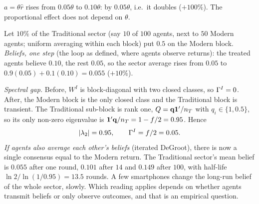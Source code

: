 \documentclass[../solutions_manual.tex]{subfiles}
\begin{document}
 $a = \theta\hat r$ rises from $0.05\theta$ to $0.10\theta$: by $0.05\theta$, i.e.\ it doubles ($+100\%$). The proportional effect does not depend on $\theta$.

 Let $10\%$ of the Traditional sector (say $10$ of $100$ agents, next to $50$ Modern agents; uniform averaging within each block) put $0.5$ on the Modern block. \emph{Beliefs, one step} (the loop as defined, where agents observe returns): the treated agents believe $0.10$, the rest $0.05$, so the sector average rises from $0.05$ to $0.9(0.05) + 0.1(0.10) = 0.055$ ($+10\%$).

\emph{Spectral gap.} Before, $W^I$ is block-diagonal with two closed classes, so $\Gamma^I = 0$. After, the Modern block is the only closed class and the Traditional block is transient. The Traditional sub-block is rank one, $Q = \mathbf{q}\mathbf{1}'/n_T$ with $q_i \in \{1, 0.5\}$, so its only non-zero eigenvalue is $\mathbf{1}'\mathbf{q}/n_T = 1 - f/2 = 0.95$. Hence
\[
|\lambda_2| = 0.95, \qquad \Gamma^I = f/2 = 0.05 .
\]
\emph{If agents also average each other's beliefs} (iterated DeGroot), there is now a single consensus equal to the Modern return. The Traditional sector's mean belief is $0.055$ after one round, $0.101$ after $14$ and $0.149$ after $100$, with half-life $\ln 2/\ln(1/0.95) = 13.5$ rounds. A few smartphones change the long-run belief of the whole sector, slowly. Which reading applies depends on whether agents transmit beliefs or only observe outcomes, and that is an empirical question.
\end{document}
